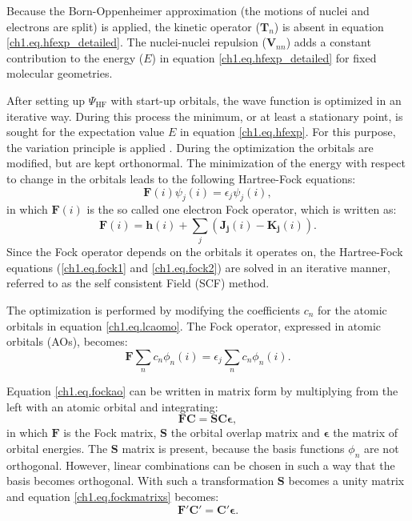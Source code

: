 Because the Born-Oppenheimer approximation (the motions of nuclei and electrons are split) is applied, the kinetic operator ($\mathbf{T}_{n}$) is absent in equation \ref{ch1.eq.hfexp_detailed}. The nuclei-nuclei repulsion ($\mathbf{V}_{nn}$) adds a constant contribution to the energy ($E$) in equation \ref{ch1.eq.hfexp_detailed} for fixed molecular geometries.

After setting up $\Psi_\mathrm{HF}$ with start-up orbitals, the wave function is optimized in an iterative way. During this process the minimum, or at least a stationary point, is sought for the expectation value $E$ in equation \ref{ch1.eq.hfexp}. For this purpose, the variation principle is applied \cite{varia}. During the optimization the orbitals are modified, but are kept orthonormal. The minimization of the energy with respect to change in the orbitals leads to the following Hartree-Fock equations:
\begin{equation}
\mathbf{F}(i)\psi_j(i)=\epsilon_j \psi_j(i),
\label{ch1.eq.fock1}
\end{equation}
in which $\mathbf{F}(i)$ is the so called one electron Fock operator, which is written as:
\begin{equation}
\mathbf{F}(i)=\mathbf{h}(i) + \sum_j (\mathbf{J_j}(i) - \mathbf{K_j}(i)).
\label{ch1.eq.fock2}
\end{equation}
Since the Fock operator depends on the orbitals it operates on, the Hartree-Fock equations (\ref{ch1.eq.fock1} and \ref{ch1.eq.fock2}) are solved in an iterative manner, referred to as the self consistent Field (SCF) method.

The optimization is performed by modifying the coefficients $c_n$ for the atomic orbitals in equation \ref{ch1.eq.lcaomo}. The Fock operator, expressed in atomic orbitals (AOs), becomes:
\begin{equation}
\mathbf{F}\sum_n c_n \phi_n (i) = \epsilon_j \sum_n c_n \phi_n (i).
\label{ch1.eq.fockao}
\end{equation}

Equation \ref{ch1.eq.fockao} can be written in matrix form by multiplying from the left with an atomic orbital and integrating:
\begin{equation}
\mathbf{F}\mathbf{C} = \mathbf{S}\mathbf{C}\mathbf{\epsilon},
\label{ch1.eq.fockmatrixs}
\end{equation}
in which $\mathbf{F}$ is the Fock matrix, $\mathbf{S}$ the orbital overlap matrix and $\mathbf{\epsilon}$ the matrix of orbital energies. The $\mathbf{S}$ matrix is present, because the basis functions $\phi_n$ are not orthogonal. However, linear combinations can be chosen in such a way that the basis becomes orthogonal. With such a transformation $\mathbf{S}$ becomes a unity matrix and equation \ref{ch1.eq.fockmatrixs} becomes:
\begin{equation}
\mathbf{F'}\mathbf{C'} = \mathbf{C'}\mathbf{\epsilon}.
\end{equation}

